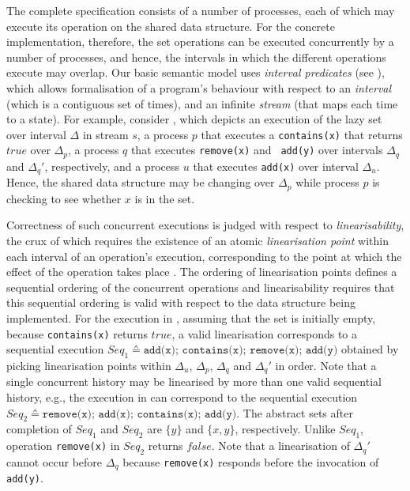 \documentclass{article}
\theoremstyle{plain}
\theoremstyle{definition}
\begin{document}
The complete specification consists of a number of processes, each of
which may execute its operation on the shared data structure. For the
concrete implementation, therefore, the set operations can be executed
concurrently by a number of processes, and hence, the intervals in
which the different operations execute may overlap. Our basic
semantic model uses \emph{interval predicates} (see
), which allows formalisation of a
program's behaviour with respect to an \emph{interval} (which is a
contiguous set of times), and an infinite \emph{stream} (that maps each
time to a state). For example, consider , which depicts
an execution of the lazy set over interval $\Delta$ in stream $s$, a
process $p$ that executes a {\tt contains(x)} that returns $true$ over
$\Delta_p$, a process $q$ that executes {\tt remove(x)} and {\tt
  add(y)} over intervals $\Delta_q$ and $\Delta_q'$, respectively, and
a process $u$ that executes {\tt add(x)} over interval
$\Delta_u$. Hence, the shared data structure may be changing over
$\Delta_p$ while process $p$ is checking to see whether $x$ is in the
set.

Correctness of such concurrent executions is judged with respect to
\emph{linearisability}, the crux of which requires the existence of an
atomic \emph{linearisation point} within each interval of an
operation's execution, corresponding to the point at which the effect
of the operation takes place \cite{Herlihy90}. The ordering of
linearisation points defines a sequential ordering of the concurrent
operations and linearisability requires that this sequential ordering
is valid with respect to the data structure being implemented.  For
the execution in , assuming that the set is initially
empty, because {\tt contains(x)} returns $true$, a valid linearisation
corresponds to a sequential execution $Seq_1 \sdef \texttt{add(x);
  contains(x); remove(x); add(y)}$ obtained by picking linearisation
points within $\Delta_u$, $\Delta_p$, $\Delta_q$ and $\Delta_q'$ in
order. Note that a single concurrent history may be linearised by more
than one valid sequential history, e.g., the execution in
 can correspond to the sequential execution $Seq_2
\sdef \texttt{remove(x); add(x); contains(x); add(y)}$. The abstract
sets after completion of $Seq_1$ and $Seq_2$ are $\{y\}$ and
$\{x,y\}$, respectively. Unlike $Seq_1$, operation {\tt remove(x)} in
$Seq_2$ returns $false$. Note that a linearisation of $\Delta_q'$
cannot occur before $\Delta_q$ because {\tt remove(x)} responds before
the invocation of {\tt add(y)}.
\end{document}
